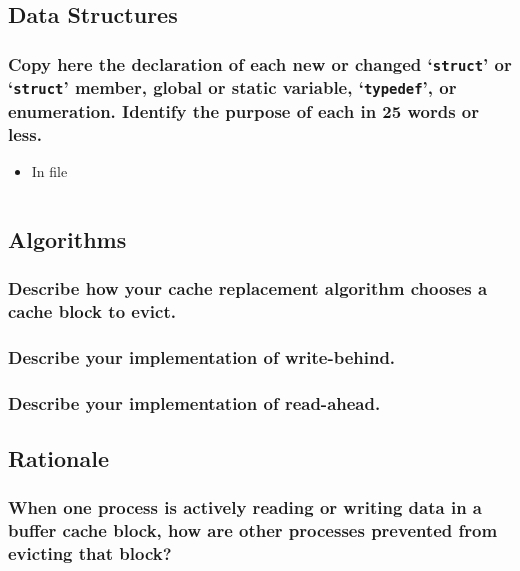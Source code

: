 \documentclass[sigconf, nonacm, balance=false, urlbreakonhyphens=true]{acmart}
\begin{document}
        \subsection{Data Structures}
            
            \subsubsection{Copy here the declaration of each new or changed `\texttt{struct}' or `\texttt{struct}' member, global or static variable, `\texttt{typedef}', or enumeration. Identify the purpose of each in 25 words or less. }
    
            \begin{itemize}
                \item In file \texttt{}
\begin{verbatim}
\end{verbatim}
            \end{itemize}

        \subsection{Algorithms}

            \subsubsection{Describe how your cache replacement algorithm chooses a cache block to evict. } 

            \subsubsection{Describe your implementation of write-behind. }

            \subsubsection{Describe your implementation of read-ahead. }
        
        \subsection{Rationale}

            \subsubsection{When one process is actively reading or writing data in a buffer cache block, how are other processes prevented from evicting that block? }
\end{document}

